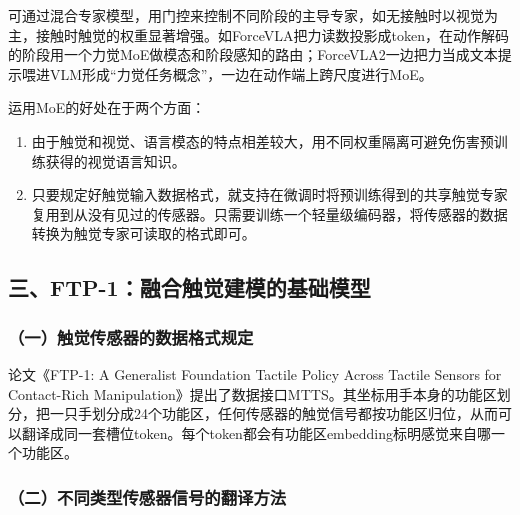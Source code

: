 可通过混合专家模型，用门控来控制不同阶段的主导专家，如无接触时以视觉为主，接触时触觉的权重显著增强。如ForceVLA把力读数投影成token，在动作解码的阶段用一个力觉MoE做模态和阶段感知的路由；ForceVLA2一边把力当成文本提示喂进VLM形成``力觉任务概念''，一边在动作端上跨尺度进行MoE。

运用MoE的好处在于两个方面：

\begin{enumerate}
\def\labelenumi{\arabic{enumi}.}
\item
  由于触觉和视觉、语言模态的特点相差较大，用不同权重隔离可避免伤害预训练获得的视觉语言知识。
\item
  只要规定好触觉输入数据格式，就支持在微调时将预训练得到的共享触觉专家复用到从没有见过的传感器。只需要训练一个轻量级编码器，将传感器的数据转换为触觉专家可读取的格式即可。
\end{enumerate}

\hypertarget{ux4e09ftp-1ux878dux5408ux89e6ux89c9ux5efaux6a21ux7684ux57faux7840ux6a21ux578b}{%
\subsection{三、FTP-1：融合触觉建模的基础模型}\label{ux4e09ftp-1ux878dux5408ux89e6ux89c9ux5efaux6a21ux7684ux57faux7840ux6a21ux578b}}

\hypertarget{ux4e00ux89e6ux89c9ux4f20ux611fux5668ux7684ux6570ux636eux683cux5f0fux89c4ux5b9a}{%
\subsubsection{（一）触觉传感器的数据格式规定}\label{ux4e00ux89e6ux89c9ux4f20ux611fux5668ux7684ux6570ux636eux683cux5f0fux89c4ux5b9a}}

论文《FTP-1: A Generalist Foundation Tactile Policy Across Tactile Sensors for Contact-Rich Manipulation》提出了数据接口MTTS。其坐标用手本身的功能区划分，把一只手划分成24个功能区，任何传感器的触觉信号都按功能区归位，从而可以翻译成同一套槽位token。每个token都会有功能区embedding标明感觉来自哪一个功能区。

\hypertarget{ux4e8cux4e0dux540cux7c7bux578bux4f20ux611fux5668ux4fe1ux53f7ux7684ux7ffbux8bd1ux65b9ux6cd5}{%
\subsubsection{（二）不同类型传感器信号的翻译方法}\label{ux4e8cux4e0dux540cux7c7bux578bux4f20ux611fux5668ux4fe1ux53f7ux7684ux7ffbux8bd1ux65b9ux6cd5}}

